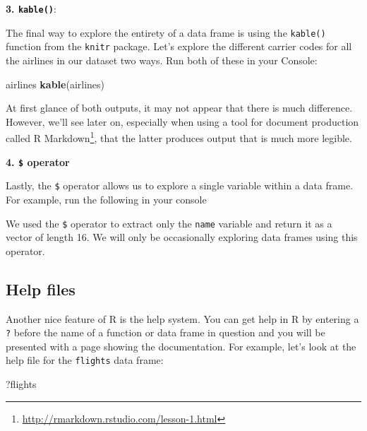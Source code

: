 \documentclass[12pt,]{krantz}
\makeatletter
\newenvironment{Shaded}{\begin{snugshade}}{\end{snugshade}}
\newcommand{\KeywordTok}[1]{\textcolor[rgb]{0.27,0.27,0.27}{\textbf{#1}}}
\newcommand{\OperatorTok}[1]{\textcolor[rgb]{0.43,0.43,0.43}{\textbf{#1}}}
\newcommand{\NormalTok}[1]{#1}
\renewcommand{\href}[2]{#2\footnote{\url{#1}}}
\newenvironment{kframe}{%
\medskip{}
\setlength{\fboxsep}{.8em}
 \def\at@end@of@kframe{}%
 \ifinner\ifhmode%
  \def\at@end@of@kframe{\end{minipage}}%
  \begin{minipage}{\columnwidth}%
 \fi\fi%
 \def\FrameCommand##1{\hskip\@totalleftmargin \hskip-\fboxsep
 \colorbox{shadecolor}{##1}\hskip-\fboxsep
     \hskip-\linewidth \hskip-\@totalleftmargin \hskip\columnwidth}%
 \MakeFramed {\advance\hsize-\width
   \@totalleftmargin\z@ \linewidth\hsize
   \@setminipage}}%
 {\par\unskip\endMakeFramed%
 \at@end@of@kframe}
\renewenvironment{Shaded}{\begin{kframe}}{\end{kframe}}
\makeatother
\begin{document}
\textbf{3. \texttt{kable()}}:

The final way to explore the entirety of a data frame is using the
\texttt{kable()} function from the \texttt{knitr} package. Let's explore
the different carrier codes for all the airlines in our dataset two
ways. Run both of these in your Console:

\begin{Shaded}
\begin{Highlighting}[]
\NormalTok{airlines}
\KeywordTok{kable}\NormalTok{(airlines)}
\end{Highlighting}
\end{Shaded}

At first glance of both outputs, it may not appear that there is much
difference. However, we'll see later on, especially when using a tool
for document production called
\href{http://rmarkdown.rstudio.com/lesson-1.html}{R Markdown}, that the
latter produces output that is much more legible.

\textbf{4. \texttt{\$} operator}

Lastly, the \texttt{\$} operator allows us to explore a single variable
within a data frame. For example, run the following in your console

\begin{Shaded}
\end{Shaded}

We used the \texttt{\$} operator to extract only the \texttt{name}
variable and return it as a vector of length 16. We will only be
occasionally exploring data frames using this operator.

\subsection{Help files}\label{help-files}

Another nice feature of R is the help system. You can get help in R by
entering a \texttt{?} before the name of a function or data frame in
question and you will be presented with a page showing the
documentation. For example, let's look at the help file for the
\texttt{flights} data frame:

\begin{Shaded}
\begin{Highlighting}[]
\NormalTok{?flights}
\end{Highlighting}
\end{Shaded}
\end{document}

